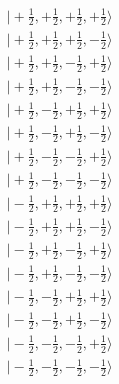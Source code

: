 \documentclass[a4paper,landscape]{article}
\begin{document}
\begin{align*}
  &\bigl|+\tfrac{1}{2}, +\tfrac{1}{2}, +\tfrac{1}{2}, +\tfrac{1}{2}\bigr\rangle\\
  &\bigl|+\tfrac{1}{2}, +\tfrac{1}{2}, +\tfrac{1}{2}, -\tfrac{1}{2}\bigr\rangle\\
  &\bigl|+\tfrac{1}{2}, +\tfrac{1}{2}, -\tfrac{1}{2}, +\tfrac{1}{2}\bigr\rangle\\
  &\bigl|+\tfrac{1}{2}, +\tfrac{1}{2}, -\tfrac{1}{2}, -\tfrac{1}{2}\bigr\rangle\\
  &\bigl|+\tfrac{1}{2}, -\tfrac{1}{2}, +\tfrac{1}{2}, +\tfrac{1}{2}\bigr\rangle\\
  &\bigl|+\tfrac{1}{2}, -\tfrac{1}{2}, +\tfrac{1}{2}, -\tfrac{1}{2}\bigr\rangle\\
  &\bigl|+\tfrac{1}{2}, -\tfrac{1}{2}, -\tfrac{1}{2}, +\tfrac{1}{2}\bigr\rangle\\
  &\bigl|+\tfrac{1}{2}, -\tfrac{1}{2}, -\tfrac{1}{2}, -\tfrac{1}{2}\bigr\rangle\\
  &\bigl|-\tfrac{1}{2}, +\tfrac{1}{2}, +\tfrac{1}{2}, +\tfrac{1}{2}\bigr\rangle\\
  &\bigl|-\tfrac{1}{2}, +\tfrac{1}{2}, +\tfrac{1}{2}, -\tfrac{1}{2}\bigr\rangle\\
  &\bigl|-\tfrac{1}{2}, +\tfrac{1}{2}, -\tfrac{1}{2}, +\tfrac{1}{2}\bigr\rangle\\
  &\bigl|-\tfrac{1}{2}, +\tfrac{1}{2}, -\tfrac{1}{2}, -\tfrac{1}{2}\bigr\rangle\\
  &\bigl|-\tfrac{1}{2}, -\tfrac{1}{2}, +\tfrac{1}{2}, +\tfrac{1}{2}\bigr\rangle\\
  &\bigl|-\tfrac{1}{2}, -\tfrac{1}{2}, +\tfrac{1}{2}, -\tfrac{1}{2}\bigr\rangle\\
  &\bigl|-\tfrac{1}{2}, -\tfrac{1}{2}, -\tfrac{1}{2}, +\tfrac{1}{2}\bigr\rangle\\
  &\bigl|-\tfrac{1}{2}, -\tfrac{1}{2}, -\tfrac{1}{2}, -\tfrac{1}{2}\bigr\rangle
\end{align*}
\end{document}
